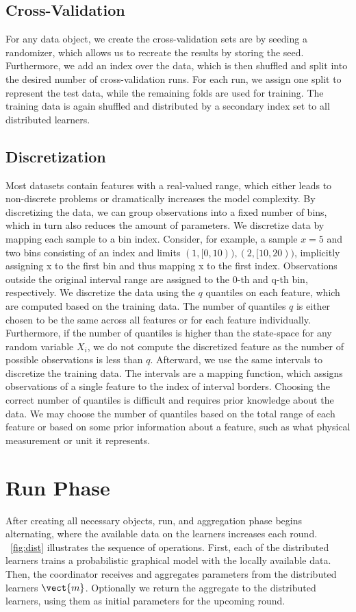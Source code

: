 \subsection{Cross-Validation}
For any data object, we create the cross-validation sets are by seeding a randomizer, which allows us to recreate the results by storing the seed.
Furthermore, we add an index over the data, which is then shuffled and split into the desired number of cross-validation runs.
For each run, we assign one split to represent the test data, while the remaining folds are used for training.
The training data is again shuffled and distributed by a secondary index set to all distributed learners.

\subsection{Discretization}
Most datasets contain features with a real-valued range, which either leads to non-discrete problems or dramatically increases the model complexity.
By discretizing the data, we can group observations into a fixed number of bins, which in turn also reduces the amount of parameters.
We discretize data by mapping each sample to a bin index.
Consider, for example, a sample $x=5$ and two bins consisting of an index and limits $(1,[0,10)),(2,[10,20))$, implicitly assigning x to the first bin and thus mapping x to the first index. 
Observations outside the original interval range are assigned to the 0-th and q-th bin, respectively.
We discretize the data using the $q$ quantiles on each feature, which are computed based on the training data. 
The number of quantiles $q$ is either chosen to be the same across all features or for each feature individually.
Furthermore, if the number of quantiles is higher than the state-space for any random variable $X_i$, we do not compute the discretized feature as the number of possible observations is less than $q$.
Afterward, we use the same intervals to discretize the training data.
The intervals are a mapping function, which assigns observations of a single feature to the index of interval borders. 
Choosing the correct number of quantiles is difficult and requires prior knowledge about the data.
We may choose the number of quantiles based on the total range of each feature or based on some prior information about a feature, such as what physical measurement or unit it represents.

\section{Run Phase}
After creating all necessary objects, run, and aggregation phase begins alternating, where the available data on the learners increases each round.
\fig~\ref{fig:dist} illustrates the sequence of operations.
First, each of the distributed learners trains a probabilistic graphical model with the locally available data.  
Then, the coordinator receives and aggregates parameters from the distributed learners $\vect{m}$. 
Optionally we return the aggregate to the distributed learners, using them as initial parameters for the upcoming round.

